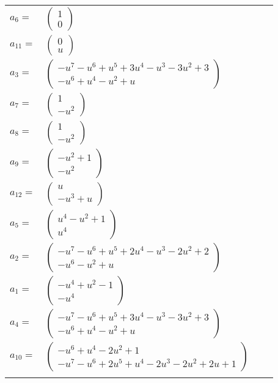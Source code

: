 \documentclass[1p]{elsarticle_modified}
\theoremstyle{definition}
\begin{document}
\begin{tabular}{m{7pt} m{180pt} m{7pt} m{180pt} }
\flushright $a_{6}=$&$\begin{pmatrix}1\\0\end{pmatrix}$ \\
\flushright $a_{11}=$&$\begin{pmatrix}0\\u\end{pmatrix}$ \\
\flushright $a_{3}=$&$\begin{pmatrix}- u^7- u^6+u^5+3 u^4- u^3-3 u^2+3\\- u^6+u^4- u^2+u\end{pmatrix}$ \\
\flushright $a_{7}=$&$\begin{pmatrix}1\\- u^2\end{pmatrix}$ \\
\flushright $a_{8}=$&$\begin{pmatrix}1\\- u^2\end{pmatrix}$ \\
\flushright $a_{9}=$&$\begin{pmatrix}- u^2+1\\- u^2\end{pmatrix}$ \\
\flushright $a_{12}=$&$\begin{pmatrix}u\\- u^3+u\end{pmatrix}$ \\
\flushright $a_{5}=$&$\begin{pmatrix}u^4- u^2+1\\u^4\end{pmatrix}$ \\
\flushright $a_{2}=$&$\begin{pmatrix}- u^7- u^6+u^5+2 u^4- u^3-2 u^2+2\\- u^6- u^2+u\end{pmatrix}$ \\
\flushright $a_{1}=$&$\begin{pmatrix}- u^4+u^2-1\\- u^4\end{pmatrix}$ \\
\flushright $a_{4}=$&$\begin{pmatrix}- u^7- u^6+u^5+3 u^4- u^3-3 u^2+3\\- u^6+u^4- u^2+u\end{pmatrix}$ \\
\flushright $a_{10}=$&$\begin{pmatrix}- u^6+u^4-2 u^2+1\\- u^7- u^6+2 u^5+u^4-2 u^3-2 u^2+2 u+1\end{pmatrix}$\\&\end{tabular}
\end{document}

